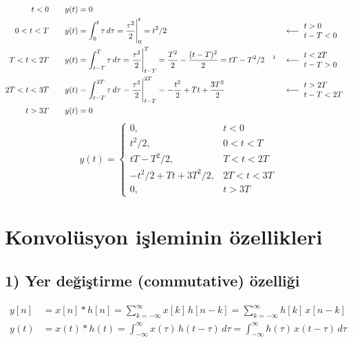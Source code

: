 \documentclass[11pt,a4paper]{article}
\begin{document}
\begin{cozum}
\begin{align*}
  t < 0 \qquad & y(t) = 0 \\
  0 < t < T \qquad & y(t) = \int_{0}^{t} \tau\,d\tau = \frac{\tau^2}{2}\Bigg|_{0}^{t} = t^2/2 && \longleftarrow \ \begin{aligned} &t > 0 \\[-1mm] &t - T < 0 \end{aligned} \\
  T < t < 2T \qquad & y(t) = \int_{t-T}^{T} \tau\,d\tau = \frac{\tau^2}{2}\Bigg|_{t-T}^{T} = \frac{T^2}{2} - \frac{(t-T)^2}{2} = tT - T^2/2 \quad \text{\footnotemark} && \longleftarrow \ \begin{aligned} &t < 2T \\[-1mm] &t - T > 0 \end{aligned} \\
  2T < t < 3T \qquad & y(t) = \int_{t-T}^{2T} \tau\,d\tau = \frac{\tau^2}{2}\Bigg|_{t-T}^{2T} = -\frac{t^2}{2} + Tt + \frac{3T^2}{2} && \longleftarrow \ \begin{aligned} &t > 2T \\[-1mm] &t - T < 2T \end{aligned} \\
  t > 3T \qquad & y(t) = 0
\end{align*}
\[ y(t) = \begin{cases}
  0, & t < 0 \\
  t^2/2, & 0 < t < T \\
  tT - T^2/2, & T < t < 2T \\
  -t^2/2 + Tt + 3T^2/2, & 2T < t < 3T \\
  0, & t > 3T
\end{cases} \]
\end{cozum}

\section{Konvolüsyon işleminin özellikleri}
\subsection{1) Yer değiştirme (commutative) özelliği}
\begin{align*}
  y[n] &= x[n] \ast h[n] = \sum_{k=-\infty}^{\infty} x[k]\,h[n-k] = \sum_{k=-\infty}^{\infty} h[k]\,x[n-k] \\
  y(t) &= x(t) \ast h(t) = \int_{-\infty}^{\infty} x(\tau)\,h(t-\tau)\,d\tau = \int_{-\infty}^{\infty} h(\tau)\,x(t-\tau)\,d\tau
\end{align*}
\end{document}
